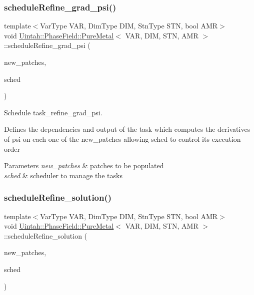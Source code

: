 \subsubsection{\texorpdfstring{schedule\+Refine\+\_\+grad\+\_\+psi()}{scheduleRefine\_grad\_psi()}}
{\footnotesize\ttfamily template$<$Var\+Type V\+AR, Dim\+Type D\+IM, Stn\+Type S\+TN, bool A\+MR$>$ \\
void \hyperlink{classUintah_1_1PhaseField_1_1PureMetal}{Uintah\+::\+Phase\+Field\+::\+Pure\+Metal}$<$ V\+AR, D\+IM, S\+TN, A\+MR $>$\+::schedule\+Refine\+\_\+grad\+\_\+psi (\begin{DoxyParamCaption}\item[{const Patch\+Set $\ast$}]{new\+\_\+patches,  }\item[{SchedulerP \&}]{sched }\end{DoxyParamCaption})\hspace{0.3cm}{\ttfamily [protected]}}



Schedule task\+\_\+refine\+\_\+grad\+\_\+psi. 

Defines the dependencies and output of the task which computes the derivatives of psi on each one of the new\+\_\+patches allowing sched to control its execution order


\begin{DoxyParams}{Parameters}
{\em new\+\_\+patches} & patches to be populated \\
\hline
{\em sched} & scheduler to manage the tasks \\
\hline
\end{DoxyParams}
\mbox{\label{classUintah_1_1PhaseField_1_1PureMetal_a5cade3bd6819bfdded02d339a6ea2642}} 
\subsubsection{\texorpdfstring{schedule\+Refine\+\_\+solution()}{scheduleRefine\_solution()}}
{\footnotesize\ttfamily template$<$Var\+Type V\+AR, Dim\+Type D\+IM, Stn\+Type S\+TN, bool A\+MR$>$ \\
void \hyperlink{classUintah_1_1PhaseField_1_1PureMetal}{Uintah\+::\+Phase\+Field\+::\+Pure\+Metal}$<$ V\+AR, D\+IM, S\+TN, A\+MR $>$\+::schedule\+Refine\+\_\+solution (\begin{DoxyParamCaption}\item[{const Patch\+Set $\ast$}]{new\+\_\+patches,  }\item[{SchedulerP \&}]{sched }\end{DoxyParamCaption})\hspace{0.3cm}{\ttfamily [protected]}}



